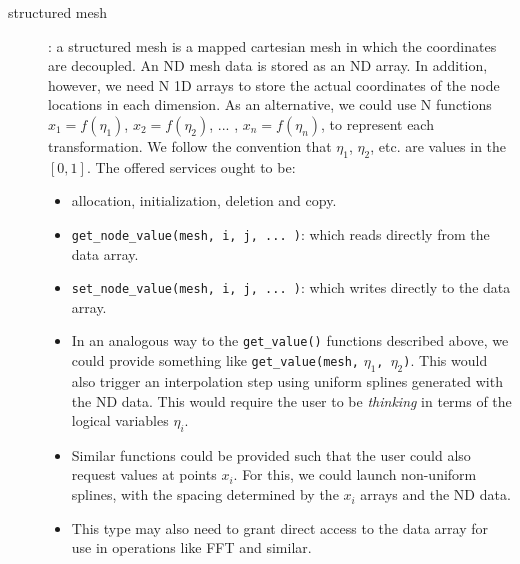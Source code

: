 \documentclass[]{report}   %
\begin{document}
\begin{description}
\item[structured mesh]: a structured mesh is a mapped cartesian mesh in which the coordinates are decoupled. An ND mesh data is stored as an ND array. In addition, however, we need N 1D arrays to store the actual coordinates of the node locations in each dimension. As an alternative, we could use N functions $x_1=f(\eta_1)$, $x_2=f(\eta_2)$, ... , $x_n=f(\eta_n)$, to represent each transformation. We follow the convention that $\eta_1$, $\eta_2$, etc.  are values in the $[0,1]$. The offered services ought to be:

\begin{itemize}
\item allocation, initialization, deletion and copy.
\item \verb+get_node_value(mesh, i, j, ... )+: which reads directly from the data array.
\item \verb+set_node_value(mesh, i, j, ... )+: which writes directly to the data array.
\item In an analogous way to the \verb+get_value()+ functions described above, we could provide something like \verb+get_value(mesh,+ $\eta_1$\verb+, +$\eta_2$\verb+)+. This would also trigger an interpolation step using uniform splines generated with the ND data. This would require the user to be \emph{thinking} in terms of the logical variables $\eta_i$. 
\item Similar functions could be provided such that the user could also request values at points $x_i$. For this, we could launch non-uniform splines, with the spacing determined by the $x_i$ arrays and the ND data.
\item This type may also need to grant direct access to the data array for use in operations like FFT and similar.
\end{itemize}


\end{description}
\end{document}
